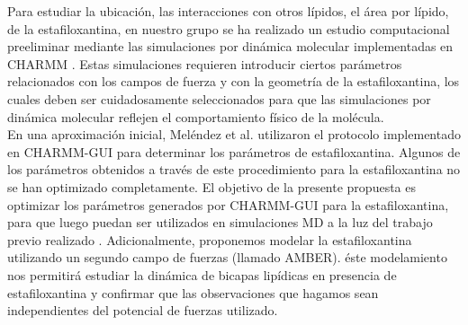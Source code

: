 Para estudiar la ubicaci\'{o}n, las interacciones con otros l\'{i}pidos, el \'{a}rea por l\'{i}pido,  de la estafiloxantina, en nuestro grupo se ha realizado un estudio computacional preeliminar mediante las simulaciones por din\'{a}mica molecular  implementadas en CHARMM \cite{MelendezDelgado2018StudyingBilayers}. Estas simulaciones requieren introducir ciertos par\'{a}metros relacionados con los campos de fuerza y con la geometr\'{i}a de la estafiloxantina, los cuales deben ser cuidadosamente seleccionados para que las simulaciones por din\'{a}mica molecular reflejen el comportamiento f\'{i}sico de la mol\'{e}cula.\\

En una aproximaci\'{o}n inicial, Mel\'{e}ndez et al. \cite{MelendezDelgado2018StudyingBilayers} utilizaron el protocolo implementado en CHARMM-GUI \cite{Sunhwan2008CHARMM-GUI:CHARMM} para determinar los par\'{a}metros de estafiloxantina. Algunos de los par\'{a}metros obtenidos a trav\'{e}s de este procedimiento para la estafiloxantina no se han optimizado completamente. El objetivo de la  presente propuesta es optimizar los par\'{a}metros generados por CHARMM-GUI para la estafiloxantina, para que luego puedan ser utilizados en simulaciones MD a la luz del trabajo previo realizado \cite{MelendezDelgado2018StudyingBilayers}. Adicionalmente, proponemos modelar la estafiloxantina utilizando un segundo campo de fuerzas (llamado AMBER). \'{e}ste modelamiento nos permitir\'{a} estudiar la din\'{a}mica de bicapas lip\'{i}dicas en presencia de estafiloxantina y confirmar que las observaciones que hagamos sean independientes del potencial de fuerzas utilizado.\\